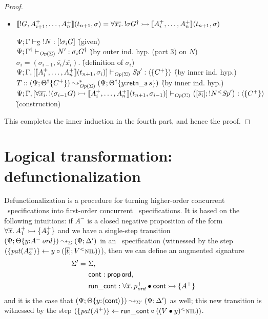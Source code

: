 \begin{proof}
\begin{itemize}
\item $\llbracket {{!}G,A^+_{i+1},\ldots,A^+_n} \rrbracket({t_{n+1}},{\sigma}) = \forall
  \overline{x_i}.\, {!}\sigma{{G}^\dag} \rightarrowtail
  \llbracket {A^+_i,\ldots,A^+_n} \rrbracket({t_{n+1}},{\sigma})$

  \begin{tabbing}
  ${\Psi}; {\Gamma} \vdash_{\Sigma} {{!}{N}} : {[{!}\sigma_i{G}]}$
  \` (given) 
  \\
  ${\Psi}; {{{\Gamma}^\dag}} \vdash_{{\it Op}({\Sigma})} {N'} : {\sigma_i{{{G}^\dag}}}$
  \` (by outer ind. hyp. (part 3)  on $N$) 
  \\
  $\sigma_i = (\sigma_{i-1}, \overline{s_i}/\overline{x_i})$.
  \` (definition of $\sigma_i$)
  \\
  ${\Psi}; {\Gamma, [\llbracket {A^+_i,\ldots,A^+_n} \rrbracket({t_{n+1}},{\sigma_{i}})]} \vdash_{{\it Op}({\Sigma})} {{\it Sp}'} : {\langle {\{ C^+ \} } \rangle}$
  \` (by inner ind. hyp.)
  \\
  $T :: (\Psi; {{{\Theta}^\dag}}\{{C^+}\}) \leadsto^*_{{\it Op}({\Sigma})}
   (\Psi; {{{\Theta}^\dag}}\{{y{:}{\sf retn\_a}\,s}\})$
  \` (by inner ind. hyp.)
  \\
  ${\Psi}; {\Gamma, [\forall \overline{x_i}.\, {!}(\sigma_{i-1}{G})
                \rightarrowtail \llbracket {A^+_i,\ldots,A^+_n} \rrbracket({t_{n+1}},{\sigma_{i-1}})]} \vdash_{{\it Op}({\Sigma})} {\left([{\overline{s_i}}]; {{{!}{N}}{^{<}}{{\it Sp}'}}\right)} : {\langle {\{ C^+ \}} \rangle}$
  \\ 
  \` (construction)
  \end{tabbing}
\end{itemize}

\noindent
This completes the inner induction in the fourth part, and hence
the proof.
\end{proof}

\section{Logical transformation: defunctionalization}
\label{sec:defunctionalization}

Defunctionalization is a procedure for turning higher-order
concurrent \sls~specifications into first-order concurrent
\sls~specifications. It is based on the following intuitions:
if $A^-$ is a closed negative proposition
of the form $\forall \overline{x}.\,A^+_1 \rightarrowtail \{ A^+_2 \}$
and we have a single-step transition 
$(\Psi; {\Theta}\{{y{:}{A^-}\,{{\it ord}}}\}) 
 \leadsto_{\Sigma} 
 (\Psi; \Delta')$
in an \sls~specification (witnessed by the step 
$(\{{{\it pat}({A^+_2})}\} \leftarrow {y} \circ {([{\overline{t}}]; {{V}{^{<}}{\textsc{nil}}})})$), 
then we can define an augmented signature
\begin{align*}
\Sigma' = ~ & \Sigma, 
\\    ~~ & {\sf cont} : {\sf prop\,ord}, 
\\    ~~ & {\sf run\_cont} : \forall{\overline x}.\,p^+_{\it ord} \mathbin{\bullet} {\sf cont} \rightarrowtail \{ A^+ \}
\end{align*}
and it is the case that 
$(\Psi; {\Theta}\{{y{:}\langle {\sf cont} \rangle}\}) 
 \leadsto_{\Sigma'} 
 (\Psi; \Delta')$
as well; this new transition is witnessed by the step
$(\{{{\it pat}({A^+})}\} \leftarrow {\sf run\_cont} \circ {({({V} \mathbin{\bullet}{y})}{^{<}}{\textsc{nil}})})$.

